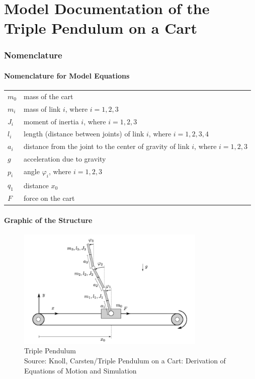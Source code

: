 \documentclass[10pt,a4paper]{article}
\begin{document}
	\part*{Model Documentation of the \\ Triple Pendulum on a Cart} %
	
	
	\section{Nomenclature} %
	\subsection{Nomenclature for Model Equations} %
	
	\begin{tabular}{ll}
		$m_0$ & mass of the cart \\
		$m_i$ & mass of link $i$, where $i = 1,2,3$ \\
		$J_i$ & moment of inertia $i$, where $i = 1,2,3$ \\
		$l_i$ & length (distance between joints) of link $i$, where $i = 1,2,3,4$ \\
		$a_i$ & distance from the joint to the center of gravity of link $i$, where $i = 1,2,3$ \\
		$g$ & acceleration due to gravity \\
		$p_i$ & angle $\varphi_i$, where $i = 1,2,3$ \\
		$q_1$ & distance $x_0$ \\
		$F$ & force on the cart \\
	\end{tabular}
	 
	\subsection{Graphic of the Structure}	
	\begin{figure}[H]
		\centering
		\captionsetup{justification=centering, margin=1cm}
		\includegraphics[width=90mm]{triple_pendulum.pdf}
		\caption{Triple Pendulum \\ \footnotesize{Source: Knoll, Carsten/Triple Pendulum on a Cart: Derivation of Equations of Motion and Simulation}}
	\end{figure}
	
\end{document}
